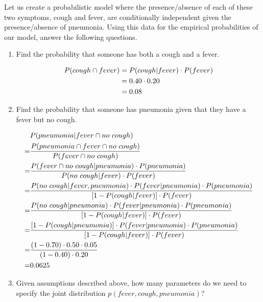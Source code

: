 \documentclass[11pt]{article}
\begin{document}
Let us create a probabilistic model where the presence/absence of each of these two symptoms, cough and fever, are conditionally independent given the presence/absence of pneumonia. Using this data for the empirical probabilities of our model, answer the following questions.
\begin{enumerate}
\item Find the probability that someone has both a cough and a fever. \\
\begin{answertext}{3cm}{}
\begin{align}
P(cough \cap fever) &= P(cough | fever) \cdot P(fever) \notag \\
&= 0.40 \cdot 0.20 \notag \\
&= 0.08 \notag
\end{align}
\end{answertext} 
\item Find the probability that someone has pneumonia given that they have a fever but no cough. \\
\begin{answertext}{9cm}{}
\begin{align}
&P(pneumonia | fever \cap no \ cough) \notag\\
=& \frac{P(pneumonia \cap fever \cap no \ cough)}{P(fever \cap no \ cough)} \notag\\
=& \frac{P(fever \cap no \ cough | pneumonia) \cdot P(pneumonia)}{P(no \ cough | fever) \cdot P(fever)} \notag\\
=& \frac{P(no \ cough | fever, pneumonia) \cdot P(fever | pneumonia) \cdot P(pneumonia)}{[1-P(cough | fever)] \cdot P(fever)} \notag\\
=& \frac{P(no \ cough | pneumonia) \cdot P(fever | pneumonia) \cdot P(pneumonia)}{[1-P(cough | fever)] \cdot P(fever)} \notag\\
=& \frac{[1-P(cough | pneumonia)] \cdot P(fever | pneumonia) \cdot P(pneumonia)}{[1-P(cough | fever)] \cdot P(fever)} \notag\\
=& \frac{(1-0.70) \cdot 0.50 \cdot 0.05}{(1-0.40) \cdot 0.20} \notag\\
=& 0.0625 \notag
\end{align}
\end{answertext} 

\newpage

\item Given assumptions described above, how many parameters do we need to specify the joint distribution $p(fever, cough, pneumonia)$?  \\
\begin{answertext}{6cm}{}
\end{answertext} 
\end{enumerate}
\end{document}
